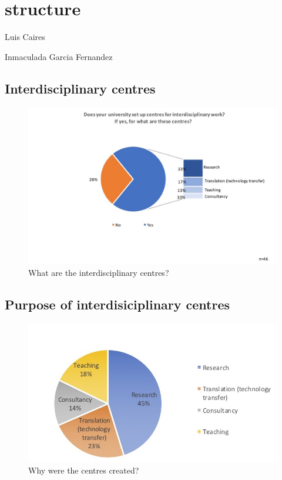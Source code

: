 \newpage
\section{structure}

Luis Caires

Inmaculada Garcia Fernandez


\subsection{Interdisciplinary centres}

\begin{figure}[h]
\centering
\includegraphics[width = \linewidth]{charts/5a.jpg}
\caption{What are the interdisciplinary centres?}
\label{sect5:centres }
\end{figure}

\subsection{Purpose of interdisiciplinary centres}

\begin{figure}[h]
\centering
\includegraphics[width = \linewidth]{charts/5b.jpg}
\caption{Why were the centres created?}
\label{sect5:reasons}
\end{figure}

